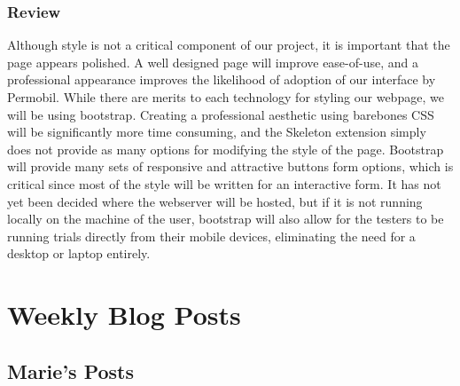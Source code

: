 \documentclass[onecolumn, draftclsnofoot,10pt, compsoc]{report}
\begin{document}
\subsection{Review}
Although style is not a critical component of our project, it is important that the page appears polished. A well designed
page will improve ease-of-use, and a professional appearance improves the likelihood of adoption of our interface by
Permobil. While there are merits to each technology for styling our webpage, we will be using bootstrap. Creating a
professional aesthetic using barebones CSS will be significantly more time consuming, and the Skeleton extension simply
does not provide as many options for modifying the style of the page. Bootstrap will provide many sets of responsive
and attractive buttons form options, which is critical since most of the style will be written for an interactive form. It
has not yet been decided where the webserver will be hosted, but if it is not running locally on the machine of the user,
bootstrap will also allow for the testers to be running trials directly from their mobile devices, eliminating the need for
a desktop or laptop entirely.


\chapter{Weekly Blog Posts}
\minitoc
\section{Marie's Posts}
\end{document}
